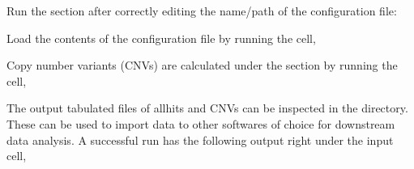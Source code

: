 \documentclass[letterpaper,10pt,english]{sphinxhowto}
\begin{document}
\sphinxAtStartPar
Run the  section after correctly editing the name/path of the configuration file:

\begin{sphinxVerbatim}[commandchars=\\\{\}]
 \PYG{p}{[} \PYG{p}{]}   
\end{sphinxVerbatim}

\sphinxAtStartPar
Load the contents of the configuration file by running the cell,

\begin{sphinxVerbatim}[commandchars=\\\{\}]
 \PYG{p}{[} \PYG{p}{]}   
\end{sphinxVerbatim}

\sphinxAtStartPar
Copy number variants (CNVs) are calculated under the  section by running the cell,

\begin{sphinxVerbatim}[commandchars=\\\{\}]
 \PYG{p}{[} \PYG{p}{]} 
\end{sphinxVerbatim}

\sphinxAtStartPar
The output tabulated files of all\sphinxhyphen{}hits and CNVs can be inspected in the  directory. These can be used to import data to other softwares of choice for downstream data analysis. A successful run has the following output right under the input cell,
\end{document}
